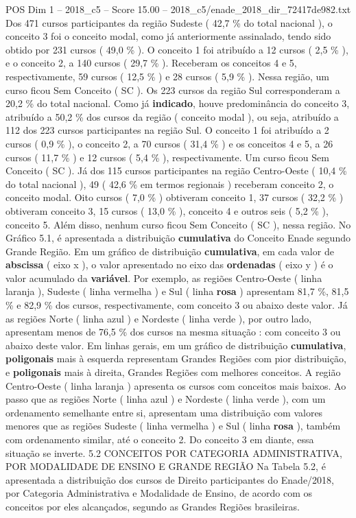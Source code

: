 \begin{textsample}{POS Dim 1 – 2018\_c5 – Score 15.00 – 2018\_c5/enade\_2018\_dir\_72417de982.txt}
Dos 471 cursos participantes da região Sudeste ( 42,7 \% do total nacional ), o conceito 3 foi o conceito modal, como já anteriormente assinalado, tendo sido obtido por 231 cursos ( 49,0 \% ).
O conceito 1 foi atribuído a 12 cursos ( 2,5 \% ), e o conceito 2, a 140 cursos ( 29,7 \% ).
Receberam os conceitos 4 e 5, respectivamente, 59 cursos ( 12,5 \% ) e 28 cursos ( 5,9 \% ).
Nessa região, um curso ficou Sem Conceito ( SC ).
Os 223 cursos da região Sul corresponderam a 20,2 \% do total nacional.
Como já \textbf{indicado}, houve predominância do conceito 3, atribuído a 50,2 \% dos cursos da região ( conceito modal ), ou seja, atribuído a 112 dos 223 cursos participantes na região Sul.
O conceito 1 foi atribuído a 2 cursos ( 0,9 \% ), o conceito 2, a 70 cursos ( 31,4 \% ) e os conceitos 4 e 5, a 26 cursos ( 11,7 \% ) e 12 cursos ( 5,4 \% ), respectivamente.
Um curso ficou Sem Conceito ( SC ).
Já dos 115 cursos participantes na região Centro-Oeste ( 10,4 \% do total nacional ), 49 ( 42,6 \% em termos regionais ) receberam conceito 2, o conceito modal.
Oito cursos ( 7,0 \% ) obtiveram conceito 1, 37 cursos ( 32,2 \% ) obtiveram conceito 3, 15 cursos ( 13,0 \% ), conceito 4 e outros seis ( 5,2 \% ), conceito 5.
Além disso, nenhum curso ficou Sem Conceito ( SC ), nessa região.
No Gráfico 5.1, é apresentada a distribuição \textbf{cumulativa} do Conceito Enade segundo Grande Região.
Em um gráfico de distribuição \textbf{cumulativa}, em cada valor de \textbf{abscissa} ( eixo x ), o valor apresentado no eixo das \textbf{ordenadas} ( eixo y ) é o valor acumulado da \textbf{variável}.
Por exemplo, as regiões Centro-Oeste ( linha laranja ), Sudeste ( linha vermelha ) e Sul ( linha \textbf{rosa} ) apresentam 81,7 \%, 81,5 \% e 82,9 \% dos cursos, respectivamente, com conceito 3 ou abaixo deste valor.
Já as regiões Norte ( linha azul ) e Nordeste ( linha verde ), por outro lado, apresentam menos de 76,5 \% dos cursos na mesma situação : com conceito 3 ou abaixo deste valor.
Em linhas gerais, em um gráfico de distribuição \textbf{cumulativa}, \textbf{poligonais} mais à esquerda representam Grandes Regiões com pior distribuição, e \textbf{poligonais} mais à direita, Grandes Regiões com melhores conceitos.
A região Centro-Oeste ( linha laranja ) apresenta os cursos com conceitos mais baixos.
Ao passo que as regiões Norte ( linha azul ) e Nordeste ( linha verde ), com um ordenamento semelhante entre si, apresentam uma distribuição com valores menores que as regiões Sudeste ( linha vermelha ) e Sul ( linha \textbf{rosa} ), também com ordenamento similar, até o conceito 2.
Do conceito 3 em diante, essa situação se inverte. 5.2 CONCEITOS POR CATEGORIA ADMINISTRATIVA, POR MODALIDADE DE ENSINO E GRANDE REGIÃO Na Tabela 5.2, é apresentada a distribuição dos cursos de Direito participantes do Enade/2018, por Categoria Administrativa e Modalidade de Ensino, de acordo com os conceitos por eles alcançados, segundo as Grandes Regiões brasileiras.

\end{textsample}
